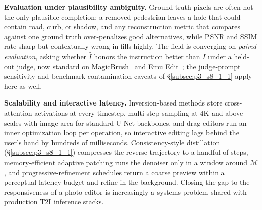 \textbf{Evaluation under plausibility ambiguity.}
Ground-truth pixels are often not the only plausible completion: a removed pedestrian leaves a hole that could contain road, curb, or shadow, and any reconstruction metric that compares against one ground truth over-penalizes good alternatives, while PSNR and SSIM rate sharp but contextually wrong in-fills highly.
The field is converging on \emph{paired evaluation}, asking whether $\hat{I}$ honors the instruction better than $I$ under a held-out judge, now standard on MagicBrush~\cite{zhang2024magicbrush} and Emu Edit~\cite{sheynin2024emu}; the judge-prompt sensitivity and benchmark-contamination caveats of §\ref{subsec:p3_s8_1_1} apply here as well.

\textbf{Scalability and interactive latency.}
Inversion-based methods store cross-attention activations at every timestep, multi-step sampling at $4$K and above scales with image area for standard U-Net backbones, and drag editors run an inner optimization loop per operation, so interactive editing lags behind the user's hand by hundreds of milliseconds.
Consistency-style distillation~\cite{song2023consistency,lcm2023} (§\ref{subsec:p3_s8_1_1}) compresses the reverse trajectory to a handful of steps, memory-efficient adaptive patching runs the denoiser only in a window around $\mathcal{M}$, and progressive-refinement schedules return a coarse preview within a perceptual-latency budget and refine in the background.
Closing the gap to the responsiveness of a photo editor is increasingly a systems problem shared with production T2I inference stacks.
